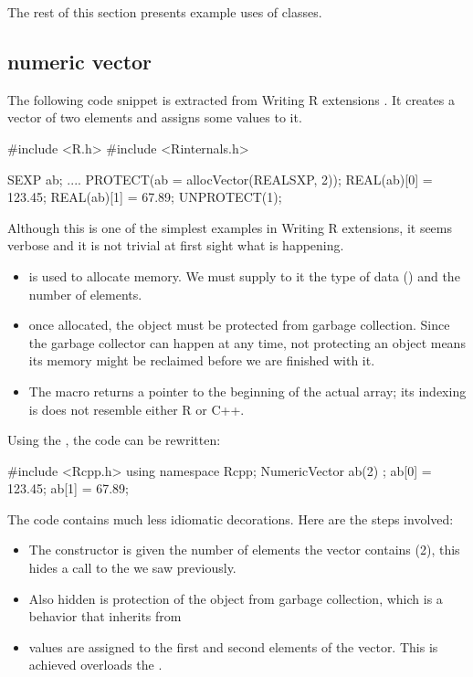 The rest of this section presents example uses of  classes. 

\subsection{numeric vector}

The following code snippet is extracted from Writing R extensions
\citep{R:exts}. It creates a  vector of two elements 
and assigns some values to it. 

\begin{example}
#include <R.h>
#include <Rinternals.h>

SEXP ab;
  ....
PROTECT(ab = allocVector(REALSXP, 2));
REAL(ab)[0] = 123.45;
REAL(ab)[1] = 67.89;
UNPROTECT(1);
\end{example}

Although this is one of the simplest examples in Writing R extensions, 
it seems verbose and it is not trivial at first sight what is happening.
\begin{itemize}
\item {} is used to allocate memory. We must supply to it 
the type of data () and the number of elements.
\item once allocated, the  object must be protected from
garbage collection. Since the garbage collector can happen at any time, 
not protecting an object means its memory might be reclaimed before we are
finished with it.
\item The  macro returns a pointer to the beginning of the 
actual array; its indexing is does not resemble either R or C++.
\end{itemize}

Using the , the code can be rewritten: 

\begin{example}
#include <Rcpp.h>
using namespace Rcpp;
NumericVector ab(2) ;
ab[0] = 123.45;
ab[1] = 67.89;
\end{example}

The code contains much less idiomatic decorations. Here are the steps involved: 
\begin{itemize}
\item The  constructor is given the number
of elements the vector contains (2), this hides a call to the 
 we saw previously. 
\item Also hidden is protection of the 
object from garbage collection, which is a behavior that 
inherits from 
\item values are assigned to the first and second elements of the vector. 
This is achieved  overloads the .
\end{itemize}


